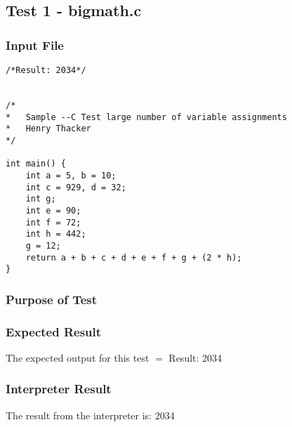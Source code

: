 \subsection{Test 1 - bigmath.c}
\subsubsection{Input File}
\begin{lstlisting}[showstringspaces=false,breaklines=true,backgroundcolor=\color{light-gray}, captionpos=b]
/*Result: 2034*/


/*
*	Sample --C Test large number of variable assignments
*	Henry Thacker
*/

int main() {
	int a = 5, b = 10;
	int c = 929, d = 32;
	int g;
	int e = 90;
	int f = 72;
	int h = 442;
	g = 12;
	return a + b + c + d + e + f + g + (2 * h); 
}
\end{lstlisting}\subsubsection{Purpose of Test}

\subsubsection{Expected Result}
The expected output for this test $=$ Result: 2034
\subsubsection{Interpreter Result}
The result from the interpreter is: 2034
